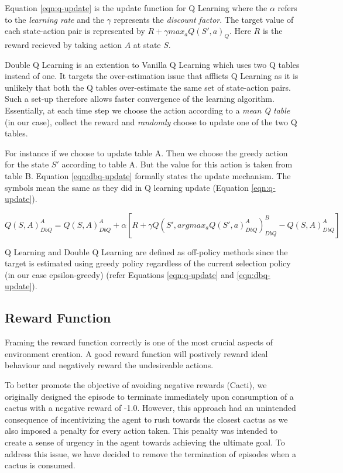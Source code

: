 \documentclass{article} %
\begin{document}
Equation \ref{eqn:q-update} is the update function for Q Learning where the $\alpha$ refers
to the \textit{learning rate} and the $\gamma$ represents the \textit{discount factor}. The
target value of each state-action pair is represented by $R+\gamma max_a Q(S', a)_Q$. Here
$R$ is the reward recieved by taking action $A$ at state $S$.

Double Q Learning is an extention to Vanilla Q Learning which uses two Q tables instead of one.
It targets the over-estimation issue that afflicts Q Learning as it is unlikely that both the
Q tables over-estimate the same set of state-action pairs. Such a set-up therefore allows
faster convergence of the learning algorithm. Essentially, at each time step we choose the
action according to a \textit{mean Q table} (in our case), collect the reward and \textit{randomly}
choose to update one of the two Q tables.

For instance if we choose to update table A. Then we choose the greedy action for the state
$S'$ according to table A. But the value for this action is taken from table B. Equation
\ref{eqn:dbq-update} formally states the update mechanism. The symbols mean the same as they
did in Q learning update (Equation \ref{eqn:q-update}).


\begin{equation}
    Q(S,A)_{DbQ}^A = Q(S,A)_{DbQ}^A + \alpha[R+\gamma Q(S', argmax_a Q(S', a)_{DbQ}^A)_{DbQ}^B-Q(S,A)_{DbQ}^A]
    \label{eqn:dbq-update}
\end{equation}

Q Learning and Double Q Learning are defined as off-policy methods since the target is
estimated using greedy policy regardless of the current selection policy (in our case
epsilon-greedy) (refer Equations \ref{eqn:q-update} and \ref{eqn:dbq-update}).

\subsection{Reward Function}
Framing the reward function correctly is one of the most crucial aspects of environment
creation. A good reward function will postively reward ideal behaviour and negatively
reward the undesireable actions.

To better promote the objective of avoiding negative rewards (Cacti), we originally designed
the episode to terminate immediately upon consumption of a cactus with a negative reward of
-1.0. However, this approach had an unintended consequence of incentivizing the agent to rush
towards the closest cactus as we also imposed a penalty for every action taken. This penalty
was intended to create a sense of urgency in the agent towards achieving the ultimate goal.
To address this issue, we have decided to remove the termination of episodes when a cactus
is consumed.
\end{document}
